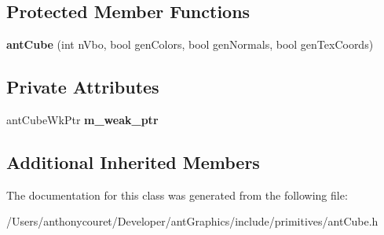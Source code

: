 \subsection*{Protected Member Functions}
\begin{DoxyCompactItemize}
\item 
\hypertarget{classant_cube_ad2676f4b7c056e4158fb8a3e1ba98a23}{{\bfseries ant\+Cube} (int n\+Vbo, bool gen\+Colors, bool gen\+Normals, bool gen\+Tex\+Coords)}\label{classant_cube_ad2676f4b7c056e4158fb8a3e1ba98a23}

\end{DoxyCompactItemize}
\subsection*{Private Attributes}
\begin{DoxyCompactItemize}
\item 
\hypertarget{classant_cube_a9f9a444abfbd29f48ed66924c35083d3}{ant\+Cube\+Wk\+Ptr {\bfseries m\+\_\+weak\+\_\+ptr}}\label{classant_cube_a9f9a444abfbd29f48ed66924c35083d3}

\end{DoxyCompactItemize}
\subsection*{Additional Inherited Members}


The documentation for this class was generated from the following file\+:\begin{DoxyCompactItemize}
\item 
/\+Users/anthonycouret/\+Developer/ant\+Graphics/include/primitives/ant\+Cube.\+h\end{DoxyCompactItemize}
